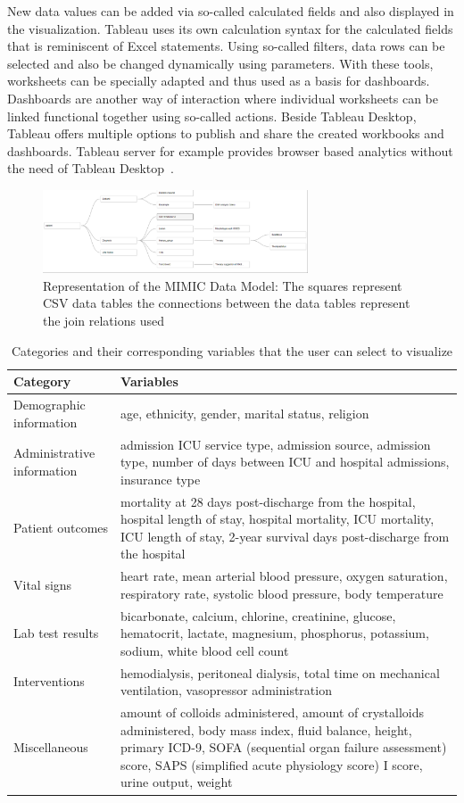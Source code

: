 \documentclass[aac,crcready]{iosart2x}
\begin{document}
New data values can be added via so-called calculated fields and also displayed in the visualization. Tableau uses its own calculation syntax for the calculated fields that is reminiscent of Excel statements. Using so-called filters, data rows can be selected and also be changed dynamically using parameters. With these tools, worksheets can be specially adapted and thus used as a basis for dashboards. Dashboards are another way of interaction where individual worksheets can be linked functional together using so-called actions. Beside Tableau Desktop, Tableau offers multiple options to publish and share the created workbooks and dashboards. Tableau server for example provides browser based analytics without the need of Tableau Desktop~\cite{Tableau.20.03.2021}. 

\begin{figure}[ht]
\includegraphics[width=0.7\textwidth]{images/datamodel_1.png}
\caption{Representation of the MIMIC Data Model: The squares represent CSV data tables the connections between the data tables represent the join relations used}\label{f1}
\end{figure}

\begin{table}
\centering
\caption{Categories and their corresponding variables that the user can select to visualize}\label{t1}
\begin{tabular}{@{}ll@{}}
\hline
Category& Variables\\
\hline
Demographic information & age, ethnicity, gender, marital status, religion\\
Administrative information & admission ICU service type, admission source, admission type, number of days between ICU and hospital admissions, insurance type  \\
Patient outcomes & mortality at 28 days post-discharge from the hospital, hospital length of stay, hospital mortality, ICU mortality, ICU length of stay, 2-year survival days post-discharge from the hospital\\
Vital signs & heart rate, mean arterial blood pressure, oxygen saturation, respiratory rate, systolic blood pressure, body temperature \\
Lab test results & bicarbonate, calcium, chlorine, creatinine, glucose, hematocrit, lactate, magnesium, phosphorus, potassium, sodium, white blood cell count \\
Interventions & hemodialysis, peritoneal dialysis, total time on mechanical ventilation, vasopressor administration\\
Miscellaneous & amount of colloids administered, amount of crystalloids administered, body mass index, fluid balance, height, primary ICD-9, SOFA (sequential organ failure assessment) score, SAPS (simplified acute physiology score) I score, urine output, weight
\hline
\end{tabular}
\end{table}
\end{document}
